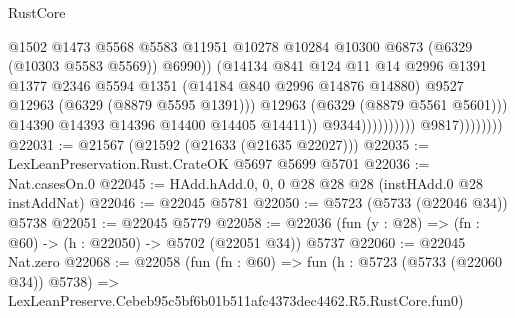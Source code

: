 \begin{lexlean}{RustCore}
\begin{coremodule}
                                                  @1502
                                                  @1473
                                                  @5568
                                                  @5583
                                                  @11951
                                                  @10278
                                                  @10284
                                                  @10300
                                                  @6873
                                                  (@6329 (@10303 @5583 @5569))
                                                  @6990))
                                              (@14134
                                                @841
                                                @124
                                                @11
                                                @14
                                                @2996
                                                @1391
                                                @1377
                                                @2346
                                                @5594
                                                @1351
                                                (@14184 @840 @2996 @14876 @14880)
                                                @9527
                                                @12963
                                                (@6329 (@8879 @5595 @1391)))
                                              @12963
                                              (@6329 (@8879 @5561 @5601)))
                                            @14390
                                            @14393
                                            @14396
                                            @14400
                                            @14405
                                            @14411))
                                        @9344))))))))))
                    @9817))))))))
@22031 := @21567 (@21592 (@21633 (@21635 @22027)))
@22035 := LexLeanPreservation.Rust.CrateOK @5697 @5699 @5701
@22036 := Nat.casesOn.{0}
@22045 := HAdd.hAdd.{0, 0, 0} @28 @28 @28 (instHAdd.{0} @28 instAddNat)
@22046 := @22045 @5781
@22050 := @5723 (@5733 (@22046 @34)) @5738
@22051 := @22045 @5779
@22058 := @22036 (fun (y : @28) => (fn : @60) -> (h : @22050) -> @5702 (@22051 @34)) @5737
@22060 := @22045 Nat.zero
@22068 := @22058
    (fun (fn : @60) =>
    fun (h : @5723 (@5733 (@22060 @34)) @5738) =>
    LexLeanPreserve.Cebeb95c5bf6b01b511afc4373dec4462.R5.RustCore.fun0)

\end{coremodule}
\end{lexlean}
